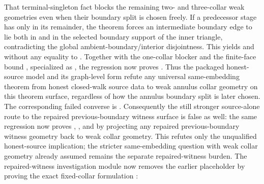 \documentclass[11pt]{article}
\begin{document}
That terminal-singleton fact blocks the remaining two- and three-collar weak
geometries even when their boundary split is chosen freely.  If a predecessor
stage has only  in its remainder, the theorem
 forces an
intermediate boundary edge to lie both in  and in the
selected boundary support of the inner triangle, contradicting the global
ambient-boundary/interior disjointness.  This yields
and
without any equality to .  Together with
the one-collar blocker and the finite-face bound
, specialized
as
,
the regression now proves
.
Thus the packaged honest-source model
and its graph-level form
refute any universal same-embedding theorem from honest closed-walk source data
to weak annulus collar geometry on this theorem surface, regardless of how the
annulus boundary split is later chosen.  The corresponding failed converse is
.
Consequently the still stronger source-alone route to the repaired
previous-boundary witness surface is false as well: the same regression now
proves
,
,
and
by projecting any repaired previous-boundary witness geometry back to weak
collar geometry.  This refutes only the unqualified honest-source implication;
the stricter same-embedding question with weak collar geometry already assumed
remains the separate repaired-witness burden.  The repaired-witness
investigation module now removes the earlier placeholder by proving the exact
fixed-collar formulation
:
\end{document}
